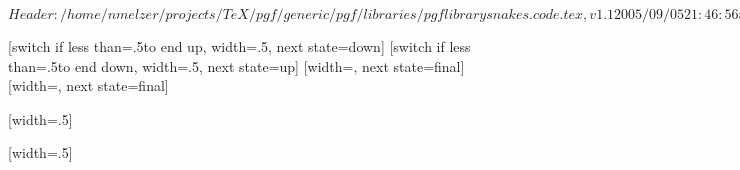 \ProvidesPackageRCS[v\pgfversion] $Header: /home/nmelzer/projects/TeX/pgf/generic/pgf/libraries/pgflibrarysnakes.code.tex,v 1.1 2005/09/05 21:46:56 tantau Exp $

%


\newdimen\pgfsnakewaveamplitude
\newdimen\pgfsnakewavelength
\pgfsnakewavelength=10pt
\pgfsnakewaveamplitude=2.5pt


%

{
  [switch if less than=.5\pgfsnakewavelength to end up,%
             width=.5\pgfsnakewavelength,%
             next state=down]
  {
    \pgfpathlineto{\pgfpoint{.25\pgfsnakewavelength}{\pgfsnakewaveamplitude}}
    \pgfpathlineto{\pgfpoint{.5\pgfsnakewavelength}{0pt}}
  }
  [switch if less than=.5\pgfsnakewavelength to end down,%
               width=.5\pgfsnakewavelength,%
               next state=up]
  {
    \pgfpathlineto{\pgfpoint{.25\pgfsnakewavelength}{-\pgfsnakewaveamplitude}}
    \pgfpathlineto{\pgfpoint{.5\pgfsnakewavelength}{0pt}}
  }
  [width=\pgfsnakeremainingdistance,
                 next state=final]
  {
    \pgfpathlineto{\pgfpoint{.5\pgfsnakeremainingdistance}{.5\pgfsnakeremainingdistance}}
    \pgfpathlineto{\pgfpoint{\pgfsnakeremainingdistance}{0pt}}
  }
  [width=\pgfsnakeremainingdistance,
                   next state=final]
  {
    \pgfpathlineto{\pgfpoint{.5\pgfsnakeremainingdistance}{-.5\pgfsnakeremainingdistance}}
    \pgfpathlineto{\pgfpoint{\pgfsnakeremainingdistance}{0pt}}
  }
}



%

{
  [width=.5\pgfsnakewavelength]
  {
    \pgfpathlineto{\pgfpoint{.5\pgfsnakewavelength}{2\pgfsnakewaveamplitude}}
    \pgfpathlineto{\pgfpoint{.5\pgfsnakewavelength}{0pt}}
  }
  {
    \pgfpathlineto{\pgfpoint{\pgfsnakeremainingdistance}{0pt}}
  }
}



%

{
  [width=.5\pgfsnakewavelength]
  {
    \pgfpathcurveto
    {\pgfpoint{0pt}{.555\pgfsnakewaveamplitude}}
    {\pgfpoint{0.11125\pgfsnakewavelength}{\pgfsnakewaveamplitude}}
    {\pgfpoint{.25\pgfsnakewavelength}{\pgfsnakewaveamplitude}}
    \pgfpathcurveto
    {\pgfpoint{.38875\pgfsnakewavelength}{\pgfsnakewaveamplitude}}
    {\pgfpoint{.5\pgfsnakewavelength}{.5\pgfsnakewaveamplitude}}
    {\pgfpoint{.5\pgfsnakewavelength}{0\pgfsnakewaveamplitude}}
  }
  {
    \pgfpathlineto{\pgfpoint{\pgfsnakeremainingdistance}{0pt}}
  }
}



